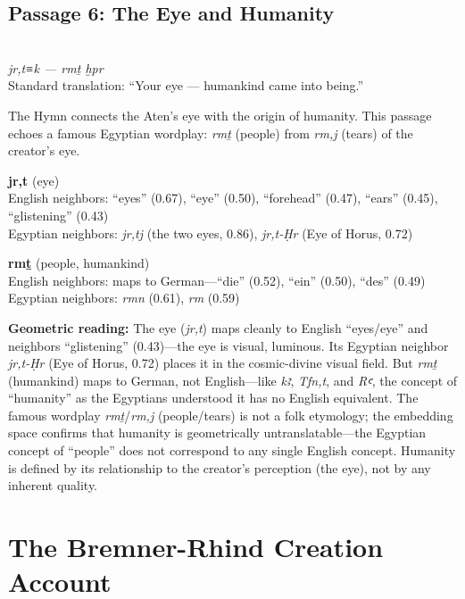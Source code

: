 \documentclass[11pt, a4paper]{article}
\newcommand{\passagehiero}[1]{{\normalfont\hierofont\fontsize{14}{17}\selectfont #1}}
\begin{document}
\subsection{Passage 6: The Eye and Humanity}

{\color{passage}\passagehiero{𓁹𓏏𓎡 --- 𓂋𓅓𓏏𓀀𓏥 𓆣𓂋}\\\medskip
\textit{\small jr,t≡k --- rmṯ ḫpr}\\
Standard translation: ``Your eye --- humankind came into being.''}

The Hymn connects the Aten's eye with the origin of humanity. This passage echoes a famous Egyptian wordplay: \textit{rmṯ} (people) from \textit{rm,j} (tears) of the creator's eye.

\bigskip

\noindent\textbf{jr,t} (eye)\\
English neighbors: ``eyes'' (0.67), ``eye'' (0.50), ``forehead'' (0.47), ``ears'' (0.45), ``glistening'' (0.43)\\
Egyptian neighbors: \textit{jr,tj} (the two eyes, 0.86), \textit{jr,t-Ḥr} (Eye of Horus, 0.72)

\medskip

\noindent\textbf{rmṯ} (people, humankind)\\
English neighbors: maps to German---``die'' (0.52), ``ein'' (0.50), ``des'' (0.49)\\
Egyptian neighbors: \textit{rmn} (0.61), \textit{rm} (0.59)

\medskip

{\color{insight}\textbf{Geometric reading:}} The eye (\textit{jr,t}) maps cleanly to English ``eyes/eye'' and neighbors ``glistening'' (0.43)---the eye is visual, luminous. Its Egyptian neighbor \textit{jr,t-Ḥr} (Eye of Horus, 0.72) places it in the cosmic-divine visual field. But \textit{rmṯ} (humankind) maps to German, not English---like \textit{kꜣ}, \textit{Tfn,t}, and \textit{Rꜥ}, the concept of ``humanity'' as the Egyptians understood it has no English equivalent. The famous wordplay \textit{rmṯ}/\textit{rm,j} (people/tears) is not a folk etymology; the embedding space confirms that humanity is geometrically untranslatable---the Egyptian concept of ``people'' does not correspond to any single English concept. Humanity is defined by its relationship to the creator's perception (the eye), not by any inherent quality.

\section{The Bremner-Rhind Creation Account}
\label{sec:bremner}
\end{document}
